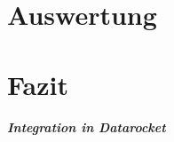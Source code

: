 \documentclass[
  language=german, %
  type=bachelor%
]{isthesis}
\begin{document}
\begin{content}
\chapter{Auswertung}

\chapter{Fazit}
 \paragraph{Integration in Datarocket}



  

\end{content}



%  







\end{document}
